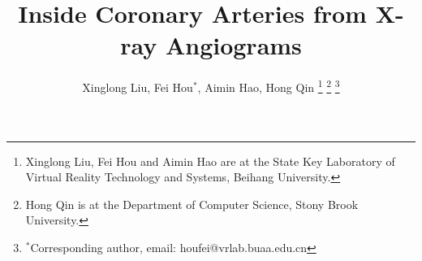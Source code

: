 \documentclass[journal]{IEEEtran}
\begin{document}
%
\title{Inside Coronary Arteries from X-ray Angiograms}
%
%
%

\author{Xinglong Liu, Fei Hou$^*$, Aimin Hao, Hong Qin
\thanks{Xinglong Liu, Fei Hou and Aimin Hao are at the State Key Laboratory of Virtual Reality Technology and Systems, Beihang University.}%
\thanks{Hong Qin is at the Department of Computer Science, Stony Brook University.}%
\thanks{$^*$Corresponding author, email: houfei@vrlab.buaa.edu.cn}}

%
%



%
\end{document}
